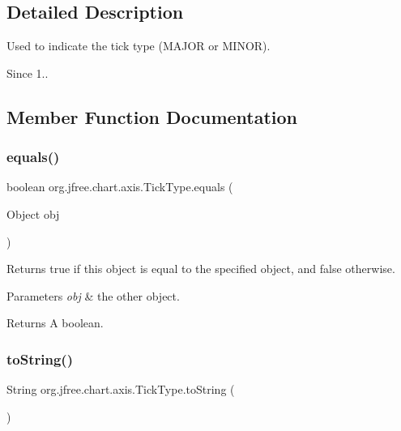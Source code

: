 \subsection{Detailed Description}
Used to indicate the tick type (M\+A\+J\+OR or M\+I\+N\+OR).

\begin{DoxySince}{Since}
1.. 
\end{DoxySince}


\subsection{Member Function Documentation}
\mbox{\label{classorg_1_1jfree_1_1chart_1_1axis_1_1_tick_type_ae4e1dab53387e17715af8ba66de97fdc}} 
\subsubsection{\texorpdfstring{equals()}{equals()}}
{\footnotesize\ttfamily boolean org.\+jfree.\+chart.\+axis.\+Tick\+Type.\+equals (\begin{DoxyParamCaption}\item[{Object}]{obj }\end{DoxyParamCaption})}

Returns {\ttfamily true} if this object is equal to the specified object, and {\ttfamily false} otherwise.


\begin{DoxyParams}{Parameters}
{\em obj} & the other object.\\
\hline
\end{DoxyParams}
\begin{DoxyReturn}{Returns}
A boolean. 
\end{DoxyReturn}
\mbox{\label{classorg_1_1jfree_1_1chart_1_1axis_1_1_tick_type_a47552fee32af5fa91ea4f1ba5c52e2ca}} 
\subsubsection{\texorpdfstring{to\+String()}{toString()}}
{\footnotesize\ttfamily String org.\+jfree.\+chart.\+axis.\+Tick\+Type.\+to\+String (\begin{DoxyParamCaption}{ }\end{DoxyParamCaption})}

